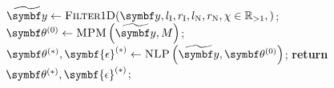 \begin{algorithm}
    \begin{algorithmic}[1]
        \caption[
            The \ac{1D} estimation procedure outlined in this work.
        ]{
            The estimation procedure outlined in this work, for the
            consideration of \ac{1D} \acp{FID}.
        }
        \label{alg:1d-2d-summary}
            \State $\widetilde{\by} \gets \textsc{Filter}1\textsc{D}(
                \by,
                l_{\text{I}},
                r_{\text{I}},
                l_{\text{N}},
                r_{\text{N}},
                \chi \in \mathbb{R}_{>1},
            )
            $;
            \State $\bthzero \gets \textsc{MPM}\left(\widetilde{\by}, M\right)$;
            \State $\bthstar, \symbf{\epsilon}^{(*)} \gets \textsc{NLP}\left(\widetilde{\by}, \bthzero\right)$;
            \State \textbf{return} $\bthstar, \symbf{\epsilon}^{(*)}$;
        \EndProcedure
    \end{algorithmic}
\end{algorithm}

